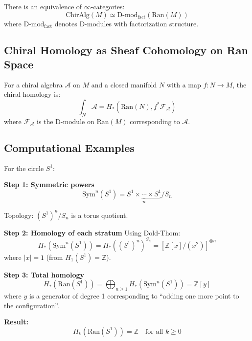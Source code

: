 \begin{theorem}
\label{thm:chiral-ran-Dmod}
There is an equivalence of $\infty$-categories:
$$\text{ChirAlg}(M) \simeq \text{D-mod}_{\text{fact}}(\text{Ran}(M))$$
where $\text{D-mod}_{\text{fact}}$ denotes D-modules with factorization structure.
\end{theorem}

\subsection{Chiral Homology as Sheaf Cohomology on Ran Space}

\begin{theorem}
\label{thm:chiral-homology-ran}
For a chiral algebra $\mathcal{A}$ on $M$ and a closed manifold $N$ with a map 
$f: N \to M$, the chiral homology is:
$$\int_N \mathcal{A} = H_*(\text{Ran}(N), f^* \mathcal{F}_{\mathcal{A}})$$
where $\mathcal{F}_{\mathcal{A}}$ is the D-module on $\text{Ran}(M)$ corresponding 
to $\mathcal{A}$.
\end{theorem}

\subsection{Computational Examples}

\begin{example}
\label{ex:homology-ran-S1}
For the circle $S^1$:

\textbf{Step 1: Symmetric powers}
$$\text{Sym}^n(S^1) = \underbrace{S^1 \times \cdots \times S^1}_{n}/S_n$$

Topology: $(S^1)^n/S_n$ is a torus quotient.

\textbf{Step 2: Homology of each stratum}
Using Dold-Thom:
$$H_*(\text{Sym}^n(S^1)) = H_*((S^1)^n)^{S_n} = 
   [\mathbb{Z}[x]/(x^2)]^{\otimes n}$$
where $|x| = 1$ (from $H_1(S^1) = \mathbb{Z}$).

\textbf{Step 3: Total homology}
$$H_*(\text{Ran}(S^1)) = \bigoplus_{n \geq 1} H_*(\text{Sym}^n(S^1)) = 
   \mathbb{Z}[y]$$
where $y$ is a generator of degree 1 corresponding to ``adding one more point to 
the configuration''.

\textbf{Result:}
$$H_k(\text{Ran}(S^1)) = \mathbb{Z} \quad \text{for all } k \geq 0$$
\end{example}

